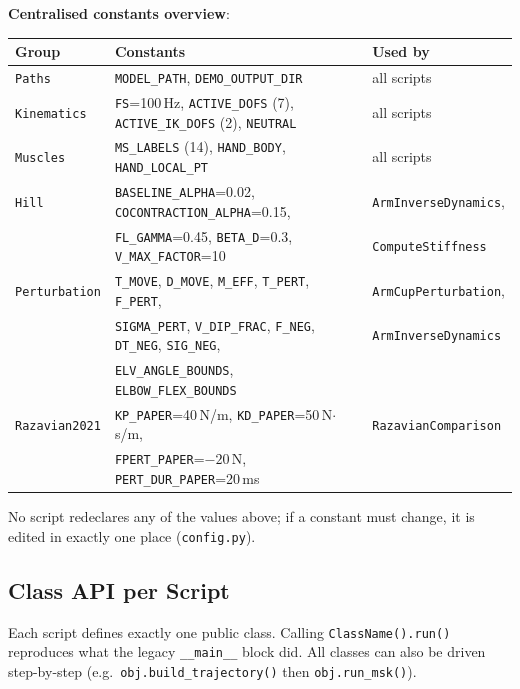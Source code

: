\documentclass[11pt,a4paper]{article}
\newcommand{\py}[1]{\texttt{\color{PipeBlue}#1}}
\newcommand{\file}[1]{\texttt{\color{PipePurple}#1}}
\begin{document}
\medskip
\textbf{Centralised constants overview}:

\begin{center}\small
\begin{tabular}{lll}
\toprule
\textbf{Group} & \textbf{Constants} & \textbf{Used by} \\
\midrule
\rowcolor{LightBlue} \texttt{Paths}
  & \py{MODEL\_PATH}, \py{DEMO\_OUTPUT\_DIR}
  & all scripts \\
\texttt{Kinematics}
  & \py{FS}=100\,Hz, \py{ACTIVE\_DOFS} (7), \py{ACTIVE\_IK\_DOFS} (2), \py{NEUTRAL}
  & all scripts \\
\rowcolor{LightBlue} \texttt{Muscles}
  & \py{MS\_LABELS} (14), \py{HAND\_BODY}, \py{HAND\_LOCAL\_PT}
  & all scripts \\
\texttt{Hill}
  & \py{BASELINE\_ALPHA}=0.02, \py{COCONTRACTION\_ALPHA}=0.15,
  & \py{ArmInverseDynamics}, \\
  & \py{FL\_GAMMA}=0.45, \py{BETA\_D}=0.3, \py{V\_MAX\_FACTOR}=10
  & \py{ComputeStiffness} \\
\rowcolor{LightBlue} \texttt{Perturbation}
  & \py{T\_MOVE}, \py{D\_MOVE}, \py{M\_EFF}, \py{T\_PERT}, \py{F\_PERT},
  & \py{ArmCupPerturbation}, \\
  \rowcolor{LightBlue}
  & \py{SIGMA\_PERT}, \py{V\_DIP\_FRAC}, \py{F\_NEG}, \py{DT\_NEG}, \py{SIG\_NEG},
  & \py{ArmInverseDynamics} \\
  \rowcolor{LightBlue}
  & \py{ELV\_ANGLE\_BOUNDS}, \py{ELBOW\_FLEX\_BOUNDS}
  & \\
\texttt{Razavian2021}
  & \py{KP\_PAPER}=40\,N/m, \py{KD\_PAPER}=50\,N$\cdot$s/m,
  & \py{RazavianComparison} \\
  & \py{FPERT\_PAPER}=$-20$\,N, \py{PERT\_DUR\_PAPER}=20\,ms
  & \\
\bottomrule
\end{tabular}
\end{center}

No script redeclares any of the values above; if a constant must change,
it is edited in exactly one place (\file{config.py}).

\subsection{Class API per Script}

Each script defines exactly one public class.  Calling
\texttt{ClassName().run()} reproduces what the legacy \texttt{\_\_main\_\_}
block did.  All classes can also be driven step-by-step
(e.g.\ \texttt{obj.build\_trajectory()} then \texttt{obj.run\_msk()}).
\end{document}
